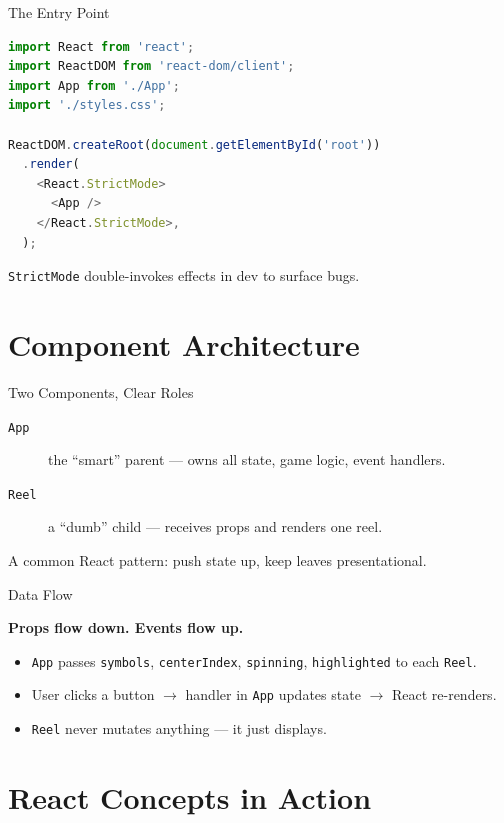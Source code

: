 \documentclass{beamer}
\begin{document}
\begin{frame}[fragile]{The Entry Point}
\begin{lstlisting}[language=JavaScript]
import React from 'react';
import ReactDOM from 'react-dom/client';
import App from './App';
import './styles.css';

ReactDOM.createRoot(document.getElementById('root'))
  .render(
    <React.StrictMode>
      <App />
    </React.StrictMode>,
  );
\end{lstlisting}
  \texttt{StrictMode} double-invokes effects in dev to surface bugs.
\end{frame}

\section{Component Architecture}

\begin{frame}{Two Components, Clear Roles}
  \begin{description}
    \item[\texttt{App}] the ``smart'' parent --- owns all state, game logic, event handlers.
    \item[\texttt{Reel}] a ``dumb'' child --- receives props and renders one reel.
  \end{description}
  \vfill
  A common React pattern: push state up, keep leaves presentational.
\end{frame}

\begin{frame}{Data Flow}
  \begin{center}
    \textbf{Props flow down. Events flow up.}
  \end{center}
  \vfill
  \begin{itemize}
    \item \texttt{App} passes \texttt{symbols}, \texttt{centerIndex}, \texttt{spinning}, \texttt{highlighted} to each \texttt{Reel}.
    \item User clicks a button $\rightarrow$ handler in \texttt{App} updates state $\rightarrow$ React re-renders.
    \item \texttt{Reel} never mutates anything --- it just displays.
  \end{itemize}
\end{frame}

\section{React Concepts in Action}
\end{document}
